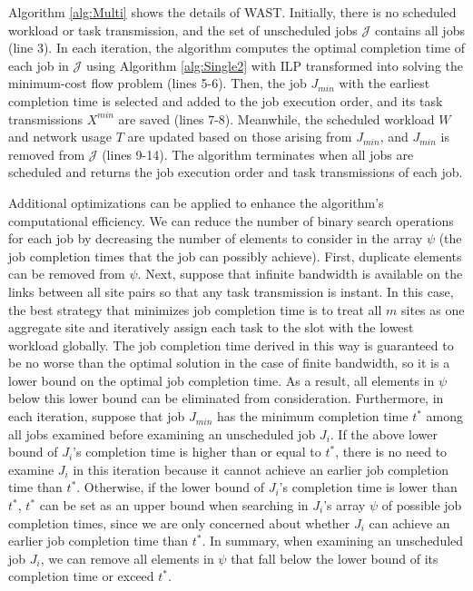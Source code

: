 Algorithm \ref{alg:Multi} shows the details of WAST.  %
Initially, there is no scheduled workload or task transmission, and the set of unscheduled jobs $\mathcal{J}$ contains all jobs (line 3). In each iteration, the algorithm computes the optimal completion time of each job in $\mathcal J$ 
using Algorithm \ref{alg:Single2} with ILP transformed into solving the minimum-cost flow problem (lines 5-6). Then, the job $J_{min}$ with the earliest completion time is selected and added to the job execution order, and its task transmissions $X^{min}$ are saved (lines 7-8). Meanwhile, the scheduled workload $W$ and network usage $T$ are updated based on those arising from $J_{min}$, and $J_{min}$ is removed from $\mathcal J$ (lines 9-14). The algorithm terminates when all jobs are scheduled and returns the job execution order and task transmissions of each job. 

Additional optimizations can be applied to enhance the algorithm's computational efficiency. We can reduce the number of binary search operations for each job by decreasing the number of elements to consider in the array $\psi$ (the job completion times that the job can possibly achieve). First, duplicate elements can be removed from $\psi$. Next, suppose that infinite bandwidth is available on the links between all site pairs so that any task transmission is instant. In this case, the best strategy that minimizes job completion time is to treat all $m$ sites as one aggregate site and iteratively assign each task to the slot with the lowest workload globally. The job completion time derived in this way is guaranteed to be no worse than the optimal solution in the case of finite bandwidth, so it is a lower bound on the optimal job completion time. As a result, all elements in $\psi$ below this lower bound can be eliminated from consideration. Furthermore, in each iteration, 
suppose that job $J_{min}$ has the minimum completion time $t^*$ among all jobs examined before examining an unscheduled job $J_i$. If the above lower bound of $J_i$'s completion time is higher than or equal to $t^*$, there is no need to examine $J_i$ in this iteration because it cannot achieve an earlier job completion time than $t^*$. Otherwise, if the lower bound of $J_i$'s completion time is lower than $t^*$, $t^*$ can be set as an upper bound when searching in $J_i$'s array $\psi$ of possible job completion times, since we are only concerned about whether $J_i$ can achieve an earlier job completion time than $t^*$. In summary, when examining an unscheduled job $J_i$, we can remove all elements in $\psi$ that fall below the lower bound of its completion time or exceed $t^*$.

